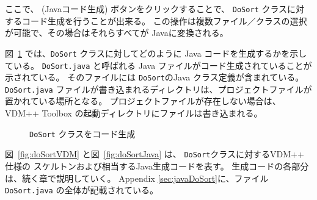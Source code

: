 \documentclass[\pformat,11pt]{jarticle}
\newcommand{\guicmd}[1]{{\sf #1}}
\begin{document}
ここで、 
(\guicmd{Javaコード生成}) ボタンをクリックすることで、 {\tt DoSort} クラスに対するコード生成を行うことが出来る。
この操作は複数ファイル／クラスの選択が可能で、その場合はそれらすべてが Javaに変換される。

図~\ref{fig:interpreter} では、{\tt DoSort} クラスに対してどのように Java コードを生成するかを示している。
{\tt  DoSort.java} と呼ばれる Java ファイルがコード生成されていることが示されている。
そのファイルには {\tt DoSort}のJava クラス定義が含まれている。
 {\tt DoSort.java} ファイルが書き込まれるディレクトリは、プロジェクトファイルが置かれている場所となる。
プロジェクトファイルが存在しない場合は、VDM++ Toolbox の起動ディレクトリにファイルは書き込まれる。

\begin{figure}[H]
\begin{center}
\mbox{}
\caption{{\tt DoSort} クラスをコード生成}\label{fig:interpreter}
\end{center}
\end{figure}

図~\ref{fig:doSortVDM} と図~\ref{fig:doSortJava} は、 {\tt DoSort}クラスに対するVDM++ 仕様の
スケルトンおよび相当するJava生成コードを表す。
生成コードの各部分は、続く章で説明していく。
Appendix \ref{sec:javaDoSort}に、ファイル {\tt DoSort.java} の全体が記載されている。
\end{document}

